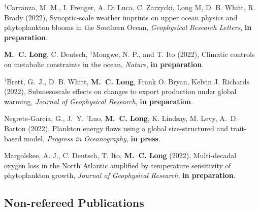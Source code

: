 \documentclass[11pt]{article}
\begin{document}
\begin{thebibliography}{99}

$^\dagger$Carranza,	M. M., I. Frenger,	A. Di Luca,	C. Zarzycki, Long	M, D. B. Whitt, R. Brady (2022),
Synoptic-scale weather imprints on upper ocean physics and phytoplankton blooms	in the Southern	Ocean,
\textit{Geophysical	Research Letters},
\textbf{in preparation}.

\textbf{M.~C. {Long}}, C. Deutsch, $^\dagger$Mongwe, N. P., and T. Ito (2022), Climatic controls on metabolic constraints in the ocean,
\textit{Nature},
\textbf{in preparation}.

$^\dagger$Brett, G.~J., D. B. Whitt, \textbf{M.~C. {Long}}, Frank O. Bryan, Kelvin J. Richards (2022), Submesoscale effects on changes to export production under global warming,
\textit{Journal of Geophysical Research},
\textbf{in preparation}.

Negrete-García, G., J.~Y. $^\dagger$Luo, \textbf{M.~C. {Long}}, K. Lindsay, M. Levy, A.~D. Barton (2022), Plankton energy flows using a global size-structured and trait-based model,
\textit{Progress in Oceanography},
\textbf{in press}.


Margolskee, A. J., C. Deutsch, T. Ito, \textbf{M.~C. {Long}} (2022),
Multi-decadal oxygen loss in the North Atlantic amplified by temperature sensitivity of phytoplankton growth,
\textit{Journal of Geophysical Research},
\textbf{in preparation}.


\end{thebibliography}

\subsection*{Non-refereed Publications}
\end{document}
